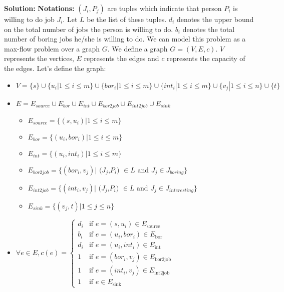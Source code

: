\documentclass[11pt, fleqn]{article}
\begin{document}
\bigskip

\textbf{Solution: } \textbf{Notations: } $(J_i,P_j)$ are tuples which indicate that person $P_i$ is willing to do job $J_i$. Let $L$ be the list of these tuples. $d_i$ denotes the upper bound on the total number of jobs the person is willing to do. $b_i$ denotes the total number of boring jobs he/she is willing to do. We can model this problem as a max-flow problem over a graph $G$. We define a graph $G = (V,E,c)$. $V$ represents the vertices, $E$ represents the edges and $c$ represents the capacity of the edges. Let's define the graph:
\begin{itemize}
    \item $V = \{s\} \cup \{u_i | 1 \leq i \leq  m\} \cup \{bor_i | 1 \leq i \leq m\} \cup \{int_i | 1 \leq i \leq m\} \cup \{v_j | 1 \leq i \leq n \} \cup \{t\}$
    
    \item $E = E_{source} \cup E_{bor} \cup E_{int} \cup E_{bor2job} \cup E_{int2job} \cup E_{sink}$
    \begin{itemize}
        \item $E_{source} = \{(s,u_i) | 1 \leq i \leq m\}$
        
        \item $E_{bor} = \{(u_i,bor_i) | 1 \leq i \leq m\}$
        
        \item $E_{int} = \{(u_i,int_i) | 1 \leq i \leq m\}$
        
        \item $E_{bor2job} = \{(bor_i,v_j) | \text{ ($J_j$,$P_i$) $\in L$ and $J_j \in J_{boring}$} \}$
        
        \item $E_{int2job} = \{(int_i,v_j) | \text{ ($J_j$,$P_i$) $\in L$ and $J_j \in J_{interesting}$}\}$
        
        \item $E_{sink} = \{(v_j,t) | 1 \leq j \leq n\}$
    \end{itemize}
    
    \item $\forall e\in E, c(e)=\begin{cases}
    d_i & \text{if } e = (s,u_i) \in E_{\text{source}}\\
    b_i & \text{if } e = (u_i,bor_i) \in E_{\text{bor}}\\
    d_i & \text{if } e = (u_i,int_i) \in E_{\text{int}}\\
    1 & \text{if } e = (bor_i,v_j) \in E_{\text{bor2job}}\\
    1 & \text{if } e = (int_i,v_j) \in E_{\text{int2job}}\\
    1 & \text{if } e \in E_{\text{sink}}
    \end{cases}$
\end{itemize}
\end{document}
